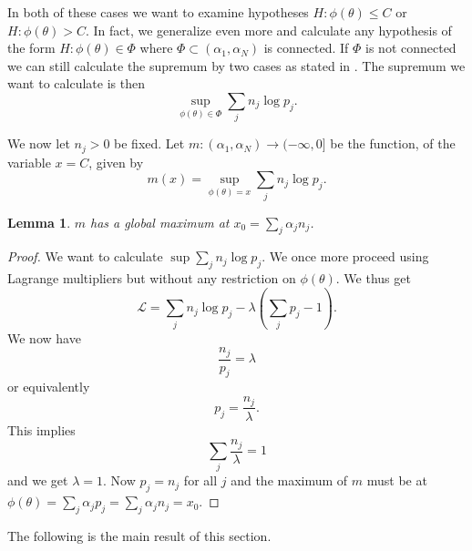 \documentclass{article}
\theoremstyle{plain}
\newtheorem{lemma}       {\bf Lemma}       [section]
\theoremstyle{definition}
\begin{document}
In both of these cases we want to examine hypotheses $H:\phi(\theta)\leq C$ or
$H:\phi(\theta)>C$. In fact, we generalize even more and calculate any hypothesis
of the form
$H:\phi(\theta)\in\Phi$ where $\Phi\subset(\alpha_1,\alpha_N)$ is connected.
If $\Phi$ is not connected we can still calculate the supremum by two cases as stated in
.
The supremum we want to calculate is then $$\sup_{\phi(\theta)\in\Phi}\sum_jn_j\log p_j.$$

We now let $n_j>0$ be fixed. Let $m:(\alpha_1,\alpha_N)\to(-\infty,0]$ be the function, of
the variable
$x=C$, given by $$m(x)=\sup_{\phi(\theta)=x}\sum_jn_j\log p_j.$$

\begin{lemma}\label{mmax}
	$m$ has a global maximum at $x_0=\sum_j\alpha_jn_j$.
\end{lemma}
\begin{proof}
	We want to calculate $\sup\sum_jn_j\log p_j$. We once more proceed using Lagrange
	multipliers but without any restriction on $\phi(\theta)$. We thus get
	$$\mathcal L=\sum_jn_j\log p_j-\lambda\left(\sum_jp_j-1\right).$$
	We now have $$\frac{n_j}{p_j}=\lambda$$ or equivalently
	$$p_j=\frac{n_j}{\lambda}.$$ This implies $$\sum_j\frac{n_j}{\lambda}=1$$
	and we get $\lambda=1$. Now $p_j=n_j$ for all $j$ and the maximum of $m$ must be
	at $\phi(\theta)=\sum_j\alpha_jp_j=\sum_j\alpha_jn_j=x_0$.
\end{proof}

The following is the main result of this section.
\end{document}
